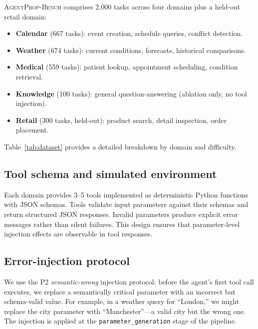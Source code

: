 \documentclass{ieeeaccess}
\newcommand{\bench}{\textsc{AgentProp-Bench}\xspace}
\begin{document}
\bench{} comprises 2{,}000 tasks across four domains plus a held-out
retail domain:
\begin{itemize}
  \item \textbf{Calendar} (667 tasks): event creation, schedule queries,
    conflict detection.
  \item \textbf{Weather} (674 tasks): current conditions, forecasts,
    historical comparisons.
  \item \textbf{Medical} (559 tasks): patient lookup, appointment
    scheduling, condition retrieval.
  \item \textbf{Knowledge} (100 tasks): general question-answering
    (ablation only, no tool injection).
  \item \textbf{Retail} (300 tasks, held-out): product search, detail
    inspection, order placement.
\end{itemize}

Table~\ref{tab:dataset} provides a detailed breakdown by domain and
difficulty.



\subsection{Tool schema and simulated environment}

Each domain provides 3--5 tools implemented as deterministic Python
functions with JSON schemas.
Tools validate input parameters against their schemas and return
structured JSON responses.
Invalid parameters produce explicit error messages rather than silent
failures.
This design ensures that parameter-level injection effects are
observable in tool responses.

\subsection{Error-injection protocol}

We use the P2 \emph{semantic-wrong} injection protocol: before the
agent's first tool call executes, we replace a semantically critical
parameter with an incorrect but schema-valid value.
For example, in a weather query for ``London,'' we might replace the
city parameter with ``Manchester''---a valid city but the wrong one.
The injection is applied at the \texttt{parameter\_generation} stage
of the pipeline.

\end{document}
